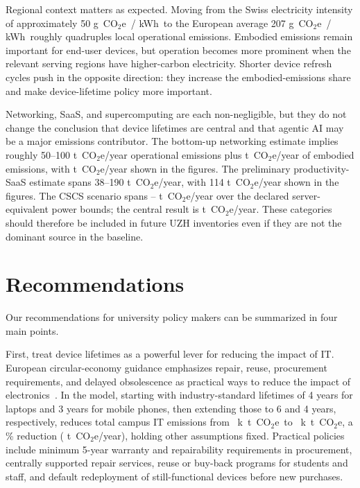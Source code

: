 \documentclass[11pt]{article}
\let\cite\parencite
\newcommand{\coe}{CO$_2$e}
\newcommand{\gcoe}{g~\coe}
\newcommand{\tcoe}{t~\coe}
\newcommand{\ktcoe}{k~\tcoe}
\newcommand{\gcoekwh}{\gcoe\ / kWh}
\begin{document}
Regional context matters as expected. Moving from the Swiss electricity
intensity of approximately 50 \gcoekwh\ to the European average 207 \gcoekwh\
roughly quadruples local operational emissions. Embodied emissions remain
important for end-user devices, but operation becomes more prominent when the
relevant serving regions have higher-carbon electricity. Shorter device refresh
cycles push in the opposite direction: they increase the embodied-emissions
share and make device-lifetime policy more important.

Networking, SaaS, and supercomputing are each non-negligible, but they do not
change the conclusion that device lifetimes are central and that agentic AI may
be a major emissions contributor. The bottom-up networking estimate implies
roughly 50--100 \tcoe/year operational emissions plus \ModelNetworkHardwareT{}
\tcoe/year of embodied emissions, with \ModelNetworkTotalT{} \tcoe/year shown in
the figures. The preliminary productivity-SaaS estimate spans 38--190
\tcoe/year, with 114 \tcoe/year shown in the figures. The CSCS scenario spans
\ModelCscsLowT{}--\ModelCscsHighT{} \tcoe/year over the declared
server-equivalent power bounds; the central result is \ModelCscsTotalT{}
\tcoe/year. These categories should therefore be included in future UZH
inventories even if they are not the dominant source in the baseline.

\FloatBarrier
\section{Recommendations}
\label{sec:recommendations}

Our recommendations for university policy makers can be summarized in four main
points.

First, treat device lifetimes as a powerful lever for reducing the impact of IT.
European circular-economy guidance emphasizes repair, reuse, procurement
requirements, and delayed obsolescence as practical ways to reduce the impact of
electronics~\cite{eea:longer:electronics,eea:product:lifespans}. In the model,
starting with industry-standard lifetimes of 4 years for laptops and 3 years for
mobile phones, then extending those to 6 and 4 years, respectively, reduces
total campus IT emissions from \ModelLifetimeBeforeKt{}~\ktcoe\ to
\ModelLifetimeAfterKt{}~\ktcoe, a \ModelLifetimeSavingPercent{}\% reduction
(\ModelLifetimeSavingT{} \tcoe/year), holding other assumptions fixed.
Practical policies include minimum 5-year warranty and repairability
requirements in procurement, centrally supported repair services, reuse or
buy-back programs for students and staff, and default redeployment of
still-functional devices before new purchases.
\end{document}
